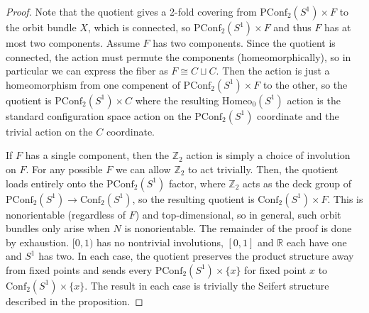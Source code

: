 \documentclass[10pt, oneside]{article}
\newcommand{\Z}{\mathbb{Z}}
\newcommand{\homeo}[1][S^1]{\text{Homeo}_0(#1)}
\newcommand{\conf}[2][S^1]{\text{Conf}_{#2}(#1)}
\newcommand{\pconf}[2][S^1]{\text{PConf}_{#2}(#1)}
\theoremstyle{definition}
\theoremstyle{definition}
\begin{document}
\begin{proof}
    Note that the quotient gives a 2-fold covering from $\pconf{2}\times F$ to the orbit bundle $X$, which is connected, so $\pconf{2}\times F$ and thus $F$ has at most two components. Assume $F$ has two components. Since the quotient is connected, the action must permute the components (homeomorphically), so in particular we can express the fiber as $F\cong C\sqcup C$. Then the action is just a homeomorphism from one compenent of $\pconf{2}\times F$ to the other, so the quotient is $\pconf{2}\times C$ where the resulting $\homeo$ action is the standard configuration space action on the $\pconf{2}$ coordinate and the trivial action on the $C$ coordinate.

    If $F$ has a single component, then the $\Z_2$ action is simply a choice of involution on $F$. For any possible $F$ we can allow $\Z_2$ to act trivially. Then, the quotient loads entirely onto the $\pconf{2}$ factor, where $\Z_2$ acts as the deck group of $\pconf{2}\to\conf{2}$, so the resulting quotient is $\conf{2}\times F$. This is nonorientable (regardless of $F$) and top-dimensional, so in general, such orbit bundles only arise when $N$ is nonorientable. The remainder of the proof is done by exhaustion. $[0,1)$ has no nontrivial involutions, $[0,1]$ and $\mathbb{R}$ each have one and $S^1$ has two. In each case, the quotient preserves the product structure away from fixed points and sends every $\pconf{2} \times \{x\}$ for fixed point $x$ to $\conf{2}\times \{x\}$. The result in each case is trivially the Seifert structure described in the proposition.
\end{proof}
\end{document}
